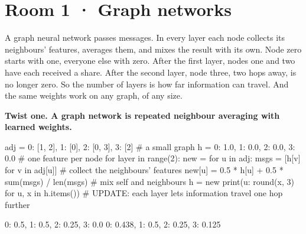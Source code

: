 \documentclass[11pt,a4paper]{report}
\begin{document}
\section*{Room 1 · Graph networks}
A graph neural network passes messages. In every layer each node collects its neighbours' features, averages them, and mixes the result with its own. Node zero starts with one, everyone else with zero. After the first layer, nodes one and two have each received a share. After the second layer, node three, two hops away, is no longer zero. So the number of layers is how far information can travel. And the same weights work on any graph, of any size.
\begin{tcolorbox}[colback=yellow!12,colframe=orange!70!black,boxrule=0.4pt,left=4pt,right=4pt,top=2pt,bottom=2pt]\textbf{Twist one. A graph network is repeated neighbour averaging with learned weights.}\end{tcolorbox}
\begin{Code}
adj = {0: [1, 2], 1: [0], 2: [0, 3], 3: [2]}      # a small graph
h = {0: 1.0, 1: 0.0, 2: 0.0, 3: 0.0}               # one feature per node
for layer in range(2):
    new = {}
    for u in adj:
        msgs = [h[v] for v in adj[u]]              # collect the neighbours' features
        new[u] = 0.5 * h[u] + 0.5 * sum(msgs) / len(msgs)   # mix self and neighbours
    h = new
    print({u: round(x, 3) for u, x in h.items()})
# UPDATE: each layer lets information travel one hop further
\end{Code}
\begin{Out}
{0: 0.5, 1: 0.5, 2: 0.25, 3: 0.0}
{0: 0.438, 1: 0.5, 2: 0.25, 3: 0.125}
\end{Out}
\end{document}
